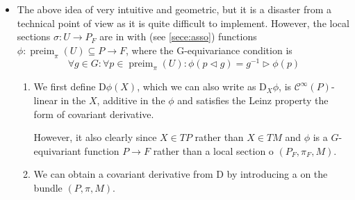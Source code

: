\documentclass{article}
\begin{document}
\begin{enumerate}
\begin{itemize}

        \item The above idea of  very intuitive and geometric, but it is a disaster from a technical point of view as it is quite difficult to implement. However, the local sections $\sigma: U \rightarrow P_{F}$ are in  with  (see \cref{sece:asso}) functions $\phi: \operatorname{preim}_{\pi}(U) \subseteq P \rightarrow F$, where the G-equivariance condition is
$$
\forall g \in G: \forall p \in \operatorname{preim}_{\pi}(U): \phi(p \triangleleft g)=g^{-1} \triangleright \phi(p)
$$    \begin{enumerate}
        \item We first define  $\mathrm{D} \phi(X)$, which we can also write as $\mathrm{D}_{X} \phi$, is $\mathcal{C}^{\infty}(P)$-linear in the $X$, additive in the $\phi$ and satisfies the Leinz property the form of covariant derivative. 
        
        However, it also clearly  since $X \in T P$ rather than $X \in T M$ and $\phi$ is a $G$-equivariant function $P \rightarrow F$ rather than a local section o $\left(P_{F}, \pi_{F}, M\right)$.
        \item We can obtain a covariant derivative from $\mathrm{D}$ by introducing a  on the bundle $(P, \pi, M)$. 
    \end{enumerate}
\end{itemize}  
\end{enumerate}




\end{document}
